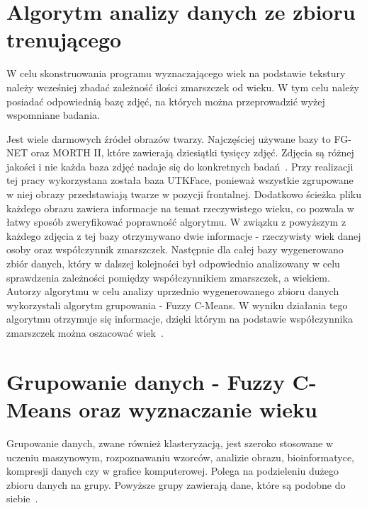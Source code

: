 \documentclass[a4paper,twoside,12pt]{book}
\begin{document}
    \section{Algorytm analizy danych ze zbioru trenującego}\label{sec:algorytmTrenowania}
    W celu skonstruowania programu wyznaczającego wiek na podstawie tekstury należy wcześniej zbadać zależność ilości
    zmarszczek od wieku.
    W tym celu należy posiadać odpowiednią bazę zdjęć, na których można przeprowadzić wyżej wspomniane badania.

    Jest wiele darmowych źródeł obrazów twarzy.
    Najczęściej używane bazy to FG-NET oraz MORTH II, które
    zawierają dziesiątki tysięcy zdjęć.
    Zdjęcia są różnej jakości i nie każda baza zdjęć nadaje się do konkretnych badań~\cite{khryashchevGanin}.
    Przy realizacji tej pracy wykorzystana została baza UTKFace,
    ponieważ wszystkie zgrupowane w niej obrazy przedstawiają twarze w pozycji frontalnej. Dodatkowo
    ścieżka pliku każdego obrazu zawiera informacje na temat rzeczywistego wieku, co pozwala w łatwy sposób
    zweryfikować poprawność algorytmu.
    W związku z powyższym z każdego zdjęcia z tej bazy otrzymywano dwie informacje - rzeczywisty wiek danej osoby oraz
    współczynnik zmarszczek.
    Następnie dla całej bazy wygenerowano zbiór danych, który w dalszej kolejności był odpowiednio analizowany w celu
    sprawdzenia zależności pomiędzy współczynnikiem zmarszczek, a wiekiem.
    Autorzy algorytmu w celu analizy uprzednio wygenerowanego zbioru danych wykorzystali algorytm grupowania -
    Fuzzy C-Means.
    W wyniku działania tego algorytmu otrzymuje się informacje, dzięki którym na podstawie współczynnika zmarszczek
    można
    oszacować wiek~\cite{wrinkleFeatures}.
    \section{Grupowanie danych - Fuzzy C-Means oraz wyznaczanie wieku}\label{sec:grupowanieDanych}
    Grupowanie danych, zwane również klasteryzacją, jest szeroko stosowane w uczeniu maszynowym, rozpoznawaniu wzorców,
    analizie obrazu, bioinformatyce, kompresji danych czy w grafice komputerowej.
    Polega na podzieleniu dużego zbioru danych na grupy.
    Powyższe grupy zawierają dane, które są podobne do siebie~\cite{clusterWstep}.
\end{document}
